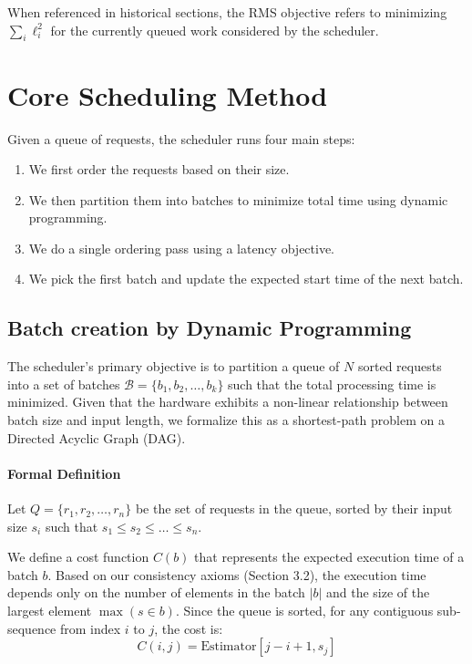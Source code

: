 \documentclass{article}
\providecommand{\tightlist}{\setlength{\itemsep}{0pt}\setlength{\parskip}{0pt}}
\begin{document}
When referenced in historical sections, the RMS objective refers to
minimizing \(\sum_i \ell_i^2\) for the
currently queued work considered by the scheduler.

\hypertarget{4-core-scheduling-method}{%
\section{Core Scheduling Method}\label{4-core-scheduling-method}}

Given a queue of requests, the scheduler runs four main steps:

\begin{enumerate}
\def\labelenumi{\arabic{enumi}.}
\tightlist
\item
  We first order the requests based on their size.
\item
  We then partition them into batches to minimize total time using
  dynamic programming.
\item
  We do a single ordering pass using a latency objective.
\item
  We pick the first batch and update the expected start time of the next
  batch.
\end{enumerate}

\hypertarget{41-batch-creation-by-dynamic-programming}{%
\subsection{Batch creation by Dynamic
Programming}\label{41-batch-creation-by-dynamic-programming}}

The scheduler's primary objective is to partition a queue of \(N\)
sorted requests into a set of batches
\(\mathcal{B} = \{b_1, b_2, \dots, b_k\}\) such that the total
processing time is minimized. Given that the hardware exhibits a
non-linear relationship between batch size and input length, we
formalize this as a shortest-path problem on a Directed Acyclic Graph
(DAG).

\hypertarget{formal-definition}{%
\paragraph{Formal Definition}\label{formal-definition}}

Let \(Q = \{r_1, r_2, \dots, r_n\}\) be the set of requests in the
queue, sorted by their input size \(s_i\) such that
\(s_1 \le s_2 \le \dots \le s_n\).

We define a cost function \(C(b)\) that represents the expected
execution time of a batch \(b\). Based on our consistency axioms
(Section 3.2), the execution time depends only on the number of elements
in the batch \(|b|\) and the size of the largest element
\(\max(s \in b)\). Since the queue is sorted, for any contiguous
sub-sequence from index \(i\) to \(j\), the cost is:
\[C(i, j) = \text{Estimator}[j - i + 1, s_j]\]
\end{document}
